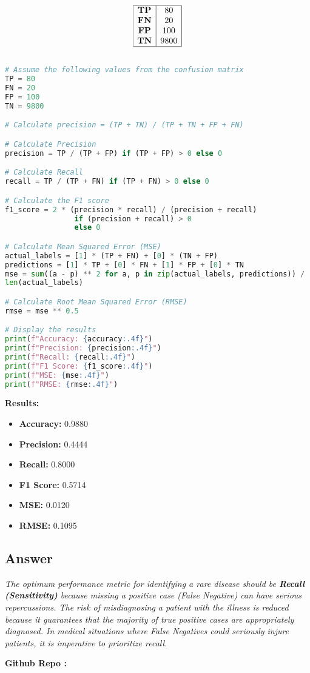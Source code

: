 \documentclass{exam}
\begin{document}
\[
\begin{array}{|c|c|}
\hline
\textbf{TP} & 80 \\
\textbf{FN} & 20 \\
\textbf{FP} & 100 \\
\textbf{TN} & 9800 \\
\hline
\end{array}
\]

\begin{lstlisting}[language=Python, caption=Python Code to Calculate Metrics]

# Assume the following values from the confusion matrix
TP = 80
FN = 20
FP = 100
TN = 9800

# Calculate precision = (TP + TN) / (TP + TN + FP + FN)

# Calculate Precision
precision = TP / (TP + FP) if (TP + FP) > 0 else 0

# Calculate Recall
recall = TP / (TP + FN) if (TP + FN) > 0 else 0

# Calculate the F1 score
f1_score = 2 * (precision * recall) / (precision + recall) 
                if (precision + recall) > 0 
                else 0

# Calculate Mean Squared Error (MSE)
actual_labels = [1] * (TP + FN) + [0] * (TN + FP)
predictions = [1] * TP + [0] * FN + [1] * FP + [0] * TN
mse = sum((a - p) ** 2 for a, p in zip(actual_labels, predictions)) / 
len(actual_labels)

# Calculate Root Mean Squared Error (RMSE)
rmse = mse ** 0.5

# Display the results
print(f"Accuracy: {accuracy:.4f}")
print(f"Precision: {precision:.4f}")
print(f"Recall: {recall:.4f}")
print(f"F1 Score: {f1_score:.4f}")
print(f"MSE: {mse:.4f}")
print(f"RMSE: {rmse:.4f}")
\end{lstlisting}

\textbf{Results:}

\begin{itemize}
    \item \textbf{Accuracy:} 0.9880
    \item \textbf{Precision:} 0.4444
    \item \textbf{Recall:} 0.8000
    \item \textbf{F1 Score:} 0.5714
    \item \textbf{MSE:} 0.0120
    \item \textbf{RMSE:} 0.1095
\end{itemize}


\subsection{Answer}
\textit{The optimum performance metric for identifying a rare disease should be \textbf{Recall (Sensitivity)} because missing a positive case (False Negative) can have serious repercussions. The risk of misdiagnosing a patient with the illness is reduced because it guarantees that the majority of true positive cases are appropriately diagnosed. In medical situations where False Negatives could seriously injure patients, it is imperative to prioritize recall.} \hfill \break

\vfill

\textbf{Github Repo :} \newline
\end{document}
